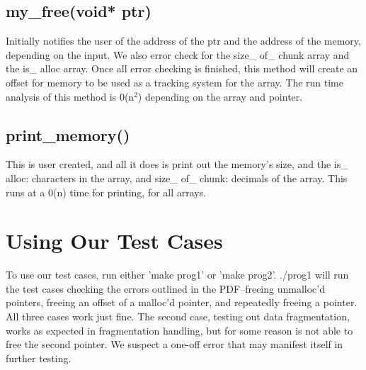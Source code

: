 \documentclass{article}
\begin{document}
\subsection*{my\_free(void* ptr)}
Initially notifies the user of the address of the ptr and the address of the memory, depending on the input.  We also error check for the size\_ of\_ chunk array and the is\_ alloc array.  Once all error checking is finished, this method will create an offset for memory to be used as a tracking system for the array.  The run time analysis of this method is 0(n$^2$) depending on the array and pointer.

\subsection*{print\_memory()}
This is user created, and all it does is print out the memory's size, and the is\_ alloc: characters in the array, and size\_ of\_ chunk: decimals of the array.
This runs at a 0(n) time for printing, for all arrays.


\section{Using Our Test Cases}
To use our test cases, run either 'make prog1' or 'make prog2'. ./prog1 will run the test cases checking the errors outlined in the PDF--freeing unmalloc'd pointers, freeing an offset of a malloc'd pointer, and repeatedly freeing a pointer. All three cases work just fine. The second case, testing out data fragmentation, works as expected in fragmentation handling, but for some reason is not able to free the second pointer. We suspect a one-off error that may manifest itself in further testing.
\end{document}
